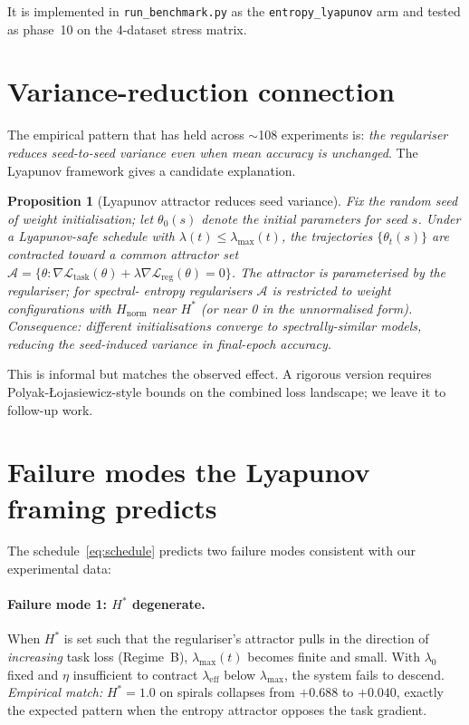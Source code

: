 \documentclass[11pt,a4paper]{article}
\newtheorem{proposition}{Proposition}
\newcommand{\hnorm}{H_{\text{norm}}}
\newcommand{\Ltask}{\mathcal{L}_{\text{task}}}
\newcommand{\Lreg}{\mathcal{L}_{\text{reg}}}
\begin{document}
It is implemented in \texttt{run\_benchmark.py} as the
\texttt{entropy\_lyapunov} arm and tested as phase~10 on the
4-dataset stress matrix.

\section{Variance-reduction connection}

The empirical pattern that has held across $\sim$108 experiments is:
\emph{the regulariser reduces seed-to-seed variance even when mean
accuracy is unchanged}. The Lyapunov framework gives a candidate
explanation.

\begin{proposition}[Lyapunov attractor reduces seed variance]
Fix the random seed of weight initialisation; let $\theta_0(s)$
denote the initial parameters for seed $s$. Under a Lyapunov-safe
schedule with $\lambda(t) \leq \lambda_{\max}(t)$, the trajectories
$\{\theta_t(s)\}$ are contracted toward a common attractor set
$\mathcal{A} = \{\theta : \nabla\Ltask(\theta) + \lambda \nabla\Lreg(\theta) = 0\}$.
The attractor is parameterised by the regulariser; for spectral-
entropy regularisers $\mathcal{A}$ is restricted to weight
configurations with $\hnorm$ near $H^*$ (or near 0 in the unnormalised
form). \emph{Consequence:} different initialisations converge to
spectrally-similar models, reducing the seed-induced variance in
final-epoch accuracy.
\end{proposition}

This is informal but matches the observed effect. A rigorous version
requires Polyak-Łojasiewicz-style bounds on the combined loss
landscape; we leave it to follow-up work.

\section{Failure modes the Lyapunov framing predicts}

The schedule~\eqref{eq:schedule} predicts two failure modes consistent
with our experimental data:

\paragraph{Failure mode 1: $H^*$ degenerate.}
When $H^*$ is set such that the regulariser's attractor pulls in
the direction of \emph{increasing} task loss (Regime~B),
$\lambda_{\max}(t)$ becomes finite and small. With $\lambda_0$ fixed
and $\eta$ insufficient to contract $\lambda_{\text{eff}}$ below
$\lambda_{\max}$, the system fails to descend. \emph{Empirical match:}
$H^* = 1.0$ on spirals collapses from $+0.688$ to $+0.040$, exactly the
expected pattern when the entropy attractor opposes the task gradient.
\end{document}
